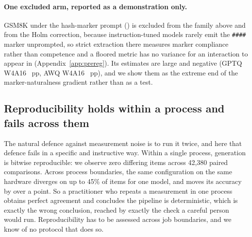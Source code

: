 \documentclass[11pt]{article}
\begin{document}
\paragraph{One excluded arm, reported as a demonstration only.}
GSM8K under the hash-marker prompt (\hThreeGsmDemoExcluded) is excluded from the
family above and from the Holm correction, because instruction-tuned models
rarely emit the \texttt{\#\#\#\#} marker unprompted, so strict extraction there measures
marker compliance rather than competence and a floored metric has no variance for
an interaction to appear in (Appendix~\ref{app:prereg}). Its estimates are large and
negative (GPTQ W4A16 \hThreeGsmDemoGptqFour{}~pp, AWQ W4A16
\hThreeGsmDemoAwq{}~pp), and we show them as the extreme end of the
marker-naturalness gradient rather than as a test.

\subsection{Reproducibility holds within a process and fails across them}
\label{sec:crossjob}


The natural defence against measurement noise is to run it twice, and here that
defence fails in a specific and instructive way. Within a single process,
generation is bitwise reproducible: we observe zero differing items across
42{,}380 paired comparisons. Across process boundaries, the same configuration on
the same hardware diverges on up to 45\% of items for one model, and moves its
accuracy by over a point. So a practitioner who repeats a measurement in one
process obtains perfect agreement and concludes the pipeline is deterministic,
which is exactly the wrong conclusion, reached by exactly the check a careful
person would run. Reproducibility has to be assessed across job boundaries, and
we know of no protocol that does so.
\end{document}
